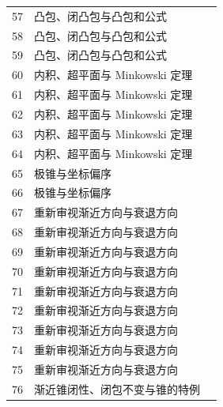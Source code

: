 \begin{longtable}{r p{.66\linewidth} r}
57 & 凸包、闭凸包与凸包和公式 & \pageref{g:109:55}\\

58 & 凸包、闭凸包与凸包和公式 & \pageref{g:109:55}\\

59 & 凸包、闭凸包与凸包和公式 & \pageref{g:109:55}\\

60 & 内积、超平面与 Minkowski 定理 & \pageref{g:109:60}\\

61 & 内积、超平面与 Minkowski 定理 & \pageref{g:109:60}\\

62 & 内积、超平面与 Minkowski 定理 & \pageref{g:109:60}\\

63 & 内积、超平面与 Minkowski 定理 & \pageref{g:109:60}\\

64 & 内积、超平面与 Minkowski 定理 & \pageref{g:109:60}\\

65 & 极锥与坐标偏序 & \pageref{g:109:65}\\

66 & 极锥与坐标偏序 & \pageref{g:109:65}\\

67 & 重新审视渐近方向与衰退方向 & \pageref{g:109:67}\\

68 & 重新审视渐近方向与衰退方向 & \pageref{g:109:67}\\

69 & 重新审视渐近方向与衰退方向 & \pageref{g:109:67}\\

70 & 重新审视渐近方向与衰退方向 & \pageref{g:109:67}\\

71 & 重新审视渐近方向与衰退方向 & \pageref{g:109:67}\\

72 & 重新审视渐近方向与衰退方向 & \pageref{g:109:67}\\

73 & 重新审视渐近方向与衰退方向 & \pageref{g:109:67}\\

74 & 重新审视渐近方向与衰退方向 & \pageref{g:109:67}\\

75 & 重新审视渐近方向与衰退方向 & \pageref{g:109:67}\\

76 & 渐近锥闭性、闭包不变与锥的特例 & \pageref{g:109:76}\\


\end{longtable}
